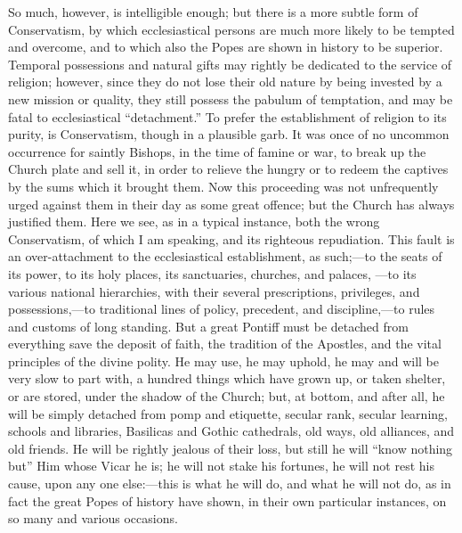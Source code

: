 So much, however, is intelligible enough; but there is a more
subtle form of Conservatism, by which ecclesiastical persons are much
more likely to be tempted and overcome, and to which also the Popes
are shown in history to be superior. Temporal possessions and natural
gifts may rightly be dedicated to the service of religion; however,
since they do not lose their old nature by being invested by a new
mission or quality, they still possess the pabulum of temptation, and
may be fatal to ecclesiastical ``detachment.'' To prefer the
establishment of religion to its purity, is Conservatism, though in a
plausible garb. It was once of no uncommon occurrence for saintly
Bishops, in the time of famine or war, to break up the Church plate
and sell it, in order to relieve the hungry or to redeem the captives
by the sums which it brought them. Now this proceeding was not
unfrequently urged against them in their day as some great offence;
but the Church has always justified them. Here we see, as in a typical
instance, both the wrong Conservatism, of which I am speaking, and its
righteous repudiation. This fault is an over-attachment to the
ecclesiastical establishment, as such;—to the seats of its power, to
its holy places, its sanctuaries, churches, and palaces, —to
its various national hierarchies, with their several prescriptions,
privileges, and possessions,—to traditional lines of policy,
precedent, and discipline,—to rules and customs of long standing.
But a great Pontiff must be detached from everything save the deposit
of faith, the tradition of the Apostles, and the vital principles of
the divine polity. He may use, he may uphold, he may and will be very
slow to part with, a hundred things which have grown up, or taken
shelter, or are stored, under the shadow of the Church; but, at
bottom, and after all, he will be simply detached from pomp and
etiquette, secular rank, secular learning, schools and libraries,
Basilicas and Gothic cathedrals, old ways, old alliances, and old
friends. He will be rightly jealous of their loss, but still he will
``know nothing but'' Him whose Vicar he is; he will not stake
his fortunes, he will not rest his cause, upon any one else:—this is
what he will do, and what he will not do, as in fact the great Popes
of history have shown, in their own particular instances, on so many
and various occasions.

